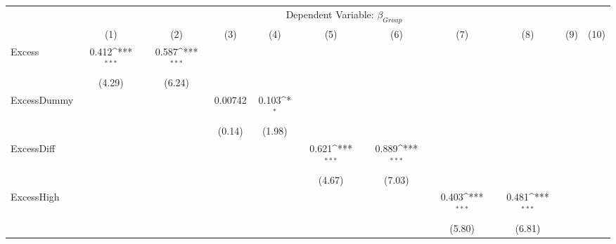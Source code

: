 {
\def\sym#1{\ifmmode^{#1}\else\(^{#1}\)\fi}
\begin{tabular}{l*{10}{c}}
\hline\hline
                &\multicolumn{10}{c}{Dependent Variable: $ \beta_{Group} $ }                                                                                                                                  \\\cmidrule(lr){2-11}
                &\multicolumn{1}{c}{(1)}         &\multicolumn{1}{c}{(2)}         &\multicolumn{1}{c}{(3)}         &\multicolumn{1}{c}{(4)}         &\multicolumn{1}{c}{(5)}         &\multicolumn{1}{c}{(6)}         &\multicolumn{1}{c}{(7)}         &\multicolumn{1}{c}{(8)}         &\multicolumn{1}{c}{(9)}         &\multicolumn{1}{c}{(10)}         \\
\hline
Excess          &    0.412\sym{***}&    0.587\sym{***}&                  &                  &                  &                  &                  &                  &                  &                  \\
                &   (4.29)         &   (6.24)         &                  &                  &                  &                  &                  &                  &                  &                  \\
[1em]
ExcessDummy     &                  &                  &  0.00742         &    0.103\sym{*}  &                  &                  &                  &                  &                  &                  \\
                &                  &                  &   (0.14)         &   (1.98)         &                  &                  &                  &                  &                  &                  \\
[1em]
ExcessDiff      &                  &                  &                  &                  &    0.621\sym{***}&    0.889\sym{***}&                  &                  &                  &                  \\
                &                  &                  &                  &                  &   (4.67)         &   (7.03)         &                  &                  &                  &                  \\
[1em]
ExcessHigh      &                  &                  &                  &                  &                  &                  &    0.403\sym{***}&    0.481\sym{***}&                  &                  \\
                &                  &                  &                  &                  &                  &                  &   (5.80)         &   (6.81)         &                  &                  \\

\end{tabular}}
